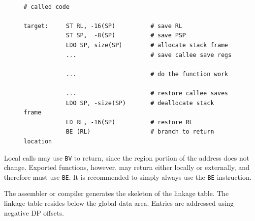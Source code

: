 \begin{figure}[H]
\centering
\lstset{style=codesnippetstyle}
\begin{lstlisting}

# called code

target:     ST RL, -16(SP)			# save RL
            ST SP,  -8(SP)          # save PSP
			LDO SP, size(SP)        # allocate stack frame
			...					    # save callee save regs
			
			...					    # do the function work
			
			...					    # restore callee saves
    	    LDO SP, -size(SP)       # deallocate stack frame
		    LD RL, -16(SP)          # restore RL
		    BE (RL)                 # branch to return location	
\end{lstlisting}
\end{figure}

Local calls may use \texttt{BV} to return, since the region portion of the address does not change. Exported functions, however, may return either locally or externally, and therefore must use \texttt{BE}. It is recommended to simply always use the \texttt{BE} instruction.


The assembler or compiler generates the skeleton of the linkage table. The linkage table resides below the global data area. Entries are addressed using negative DP offsets.

